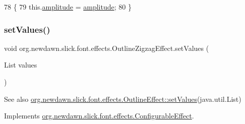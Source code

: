\begin{DoxyCode}
78                                               \{
79         this.\mbox{\hyperlink{classorg_1_1newdawn_1_1slick_1_1font_1_1effects_1_1_outline_zigzag_effect_a26543e6243bf5e4fb7486d7a7674ed1c}{amplitude}} = \mbox{\hyperlink{classorg_1_1newdawn_1_1slick_1_1font_1_1effects_1_1_outline_zigzag_effect_a26543e6243bf5e4fb7486d7a7674ed1c}{amplitude}};
80     \}
\end{DoxyCode}
\mbox{\label{classorg_1_1newdawn_1_1slick_1_1font_1_1effects_1_1_outline_zigzag_effect_a9f86c002cb637073d2d5bde424cbd351}} 
\subsubsection{\texorpdfstring{set\+Values()}{setValues()}}
{\footnotesize\ttfamily void org.\+newdawn.\+slick.\+font.\+effects.\+Outline\+Zigzag\+Effect.\+set\+Values (\begin{DoxyParamCaption}\item[{List}]{values }\end{DoxyParamCaption})\hspace{0.3cm}{\ttfamily [inline]}}

\begin{DoxySeeAlso}{See also}
\mbox{\hyperlink{classorg_1_1newdawn_1_1slick_1_1font_1_1effects_1_1_outline_effect_a02dbe78f6e87a036b850e35d3bbeb17c}{org.\+newdawn.\+slick.\+font.\+effects.\+Outline\+Effect\+::set\+Values}}(java.\+util.\+List) 
\end{DoxySeeAlso}


Implements \mbox{\hyperlink{interfaceorg_1_1newdawn_1_1slick_1_1font_1_1effects_1_1_configurable_effect_ac5e1cb43cb0c6b61753616dc746903a2}{org.\+newdawn.\+slick.\+font.\+effects.\+Configurable\+Effect}}.



